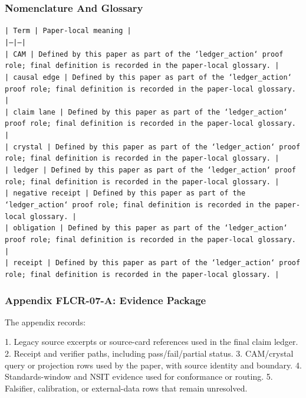 \documentclass[11pt]{article}
\begin{document}
\subsubsection*{Nomenclature And Glossary}

\noindent\texttt{| Term | Paper-local meaning |}\\
\noindent\texttt{|---|---|}\\
\noindent\texttt{| CAM | Defined by this paper as part of the `ledger\_action` proof role; final definition is recorded in the paper-local glossary. |}\\
\noindent\texttt{| causal edge | Defined by this paper as part of the `ledger\_action` proof role; final definition is recorded in the paper-local glossary. |}\\
\noindent\texttt{| claim lane | Defined by this paper as part of the `ledger\_action` proof role; final definition is recorded in the paper-local glossary. |}\\
\noindent\texttt{| crystal | Defined by this paper as part of the `ledger\_action` proof role; final definition is recorded in the paper-local glossary. |}\\
\noindent\texttt{| ledger | Defined by this paper as part of the `ledger\_action` proof role; final definition is recorded in the paper-local glossary. |}\\
\noindent\texttt{| negative receipt | Defined by this paper as part of the `ledger\_action` proof role; final definition is recorded in the paper-local glossary. |}\\
\noindent\texttt{| obligation | Defined by this paper as part of the `ledger\_action` proof role; final definition is recorded in the paper-local glossary. |}\\
\noindent\texttt{| receipt | Defined by this paper as part of the `ledger\_action` proof role; final definition is recorded in the paper-local glossary. |}\\

\subsubsection*{Appendix FLCR-07-A: Evidence Package}

The appendix records:

1. Legacy source excerpts or source-card references used in the final claim ledger.
2. Receipt and verifier paths, including pass/fail/partial status.
3. CAM/crystal query or projection rows used by the paper, with source identity and boundary.
4. Standards-window and NSIT evidence used for conformance or routing.
5. Falsifier, calibration, or external-data rows that remain unresolved.
\end{document}
